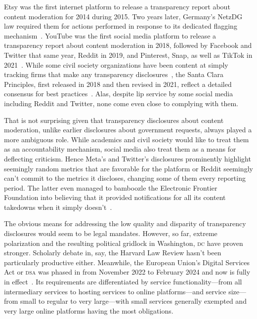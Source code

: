 \documentclass[nonacm,screen]{acmart}
\newcommand\V[1]{\textsc{\MakeLowercase{#1}}}
\begin{document}
Etsy was the first internet platform to release a transparency report about
content moderation for 2014 during 2015. Two years later, Germany's NetzDG law
required them for actions performed in response to its dedicated flagging
mechanism~\cite{TrustSafetyProfessionalAssociation2022}. YouTube was the first
social media platform to release a transparency report about content moderation
in 2018, followed by Facebook and Twitter that same year, Reddit in 2019, and
Pinterest, Snap, as well as TikTok in 2021~\cite{Binder2018,York2018}. While
some civil society organizations have been content at simply tracking firms that
make any transparency disclosures~\cite{AccessNow2021}, the Santa Clara
Principles, first released in 2018 and then revised in 2021, reflect a detailed
consensus for best
practices~\cite{AccessNowACLUFoundationOfNorthernCaliforniaea2021}. Alas,
despite lip service by some social media including Reddit and Twitter, none come
even close to complying with them.

That is not surprising given that transparency disclosures about content
moderation, unlike earlier disclosures about government requests, always played
a more ambiguous role. While academics and civil society would like to treat
them as an accountability mechanism, social media also treat them as a means for
deflecting criticism. Hence Meta's and Twitter's disclosures prominently
highlight seemingly random metrics that are favorable for the platform or Reddit
seemingly can't commit to the metrics it discloses, changing some of them every
reporting period. The latter even managed to bamboozle the Electronic Frontier
Foundation into believing that it provided notifications for all its content
takedowns when it simply doesn't~\cite{CrockerGebhartea2019,Hawkins2023}.

The obvious means for addressing the low quality and disparity of transparency
disclosures would seem to be legal mandates. However, so far, extreme
polarization and the resulting political gridlock in Washington, \V{DC} have
proven stronger. Scholarly debate in, say, the Harvard Law Review hasn't been
particularly productive either. Meanwhile, the European Union's Digital Services
Act or \V{DSA} was phased in from November 2022 to February 2024 and now is
fully in effect~\cite{EuropeanParliamentAndCouncil2022}. Its requirements are
differentiated by service functionality---from all intermediary services to
hosting services to online platforms---and service size---from small to regular
to very large---with small services generally exempted and very large online
platforms having the most obligations.
\end{document}
